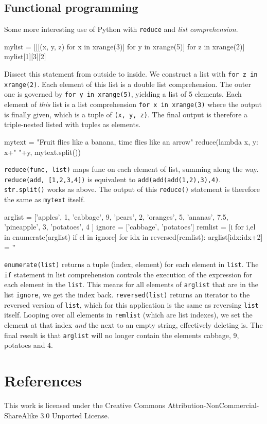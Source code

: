 \documentclass[draft=false]{article}
\newcommand{\answer}[1]{#1}%
\def\pythoni{\lstinline[language=pythontim]}
\begin{document}
\subsection{Functional programming}

Some more interesting use of Python with \pythoni{reduce} and \emph{list comprehension}.

\begin{python}
mylist = [[[(x, y, z) for x in xrange(3)] for y in xrange(5)] for z in xrange(2)]
mylist[1][3][2]
\end{python}

\answer{Dissect this statement from outside to inside. We construct a list with \pythoni{for z in xrange(2)}. Each element of this list is a double list comprehension. The outer one is governed by \pythoni{for y in xrange(5)}, yielding a list of 5 elements. Each element of \emph{this} list is a list comprehension \pythoni{for x in xrange(3)} where the output is finally given, which is a tuple of \pythoni{(x, y, z)}. The final output is therefore a triple-nested listed with tuples as elements.}

\begin{python}
mytext = "Fruit flies like a banana, time flies like an arrow"
reduce(lambda x, y: x+" "+y, mytext.split())
\end{python}

\answer{\pythoni{reduce(func, list)} maps func on each element of list, summing along the way. \pythoni{reduce(add, [1,2,3,4])} is equivalent to \pythoni{add(add(add(1,2),3),4)}. \pythoni{str.split()} works as above. The output of this \pythoni{reduce()} statement is therefore the same as \pythoni{mytext} itself.}

\begin{python}
arglist = ['apples', 1, 'cabbage', 9, 'pears', 2, 'oranges', 5, 'ananas', 7.5, 'pineapple', 3, 'potatoes', 4 ]
ignore = ['cabbage', 'potatoes']
remlist = [i for i,el in enumerate(arglist) if el in ignore]
for idx in reversed(remlist):
	arglist[idx:idx+2] = ''
\end{python}

\answer{\pythoni{enumerate(list)} returns a tuple (index, element) for each element in \pythoni{list}. The \pythoni{if} statement in list comprehension controls the execution of the expression for each element in the \pythoni{list}. This means for all elements of \pythoni{arglist} that are in the list \pythoni{ignore}, we get the index back. \pythoni{reversed(list)} returns an iterator to the reversed version of \pythoni{list}, which for this application is the same as reversing \pythoni{list} itself. Looping over all elements in \pythoni{remlist} (which are list indexes), we set the element at that index \emph{and} the next to an empty string, effectively deleting is. The final result is that \pythoni{arglist} will no longer contain the elements cabbage, 9, potatoes and 4.}


\section*{References}


This work is licensed under the Creative Commons Attribution-NonCommercial-ShareAlike 3.0 Unported License.
\end{document}
